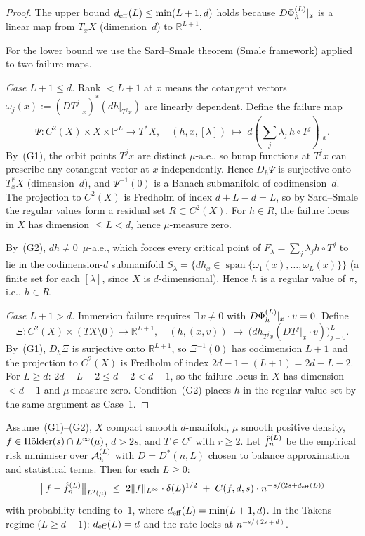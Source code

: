 \begin{proof}
The upper bound $d_{\mathrm{eff}}(L) \leq \min(L+1,d)$ holds because $D\Phi_h^{(L)}|_x$ is a
linear map from $T_x X$ (dimension~$d$) to $\mathbb{R}^{L+1}$.

For the lower bound we use the Sard--Smale theorem
(Smale \cite{Takens1981} framework) applied to two failure maps.

\emph{Case $L+1 \leq d$.}
Rank $< L+1$ at $x$ means the cotangent vectors
$\omega_j(x) := (DT^j|_x)^*(dh|_{T^j x})$ are linearly dependent.
Define the failure map
\[
  \Psi : C^2(X) \times X \times \mathbb{P}^L \to T^*X,
  \quad
  (h, x, [\lambda]) \;\mapsto\; d\!\left(\textstyle\sum_j \lambda_j\, h \circ T^j\right)\bigl|_x.
\]
By~(G1), the orbit points $T^j x$ are distinct $\mu$-a.e., so bump functions
at $T^j x$ can prescribe any cotangent vector at $x$ independently.
Hence $D_h\Psi$ is surjective onto $T^*_x X$ (dimension~$d$), and
$\Psi^{-1}(0)$ is a Banach submanifold of codimension~$d$.
The projection to $C^2(X)$ is Fredholm of index $d + L - d = L$, so by
Sard--Smale the regular values form a residual set $R \subset C^2(X)$.
For $h \in R$, the failure locus in $X$ has dimension $\leq L < d$, hence
$\mu$-measure zero.

By~(G2), $dh \neq 0$~$\mu$-a.e., which forces every critical point of
$F_\lambda = \sum_j \lambda_j h \circ T^j$ to lie in the codimension-$d$
submanifold $S_\lambda = \{dh_x \in \operatorname{span}\{\omega_1(x),\ldots,\omega_L(x)\}\}$
(a finite set for each $[\lambda]$, since $X$ is $d$-dimensional).
Hence $h$ is a regular value of $\pi$, i.e., $h \in R$.

\emph{Case $L+1 > d$.}
Immersion failure requires $\exists\, v \neq 0$ with $D\Phi_h^{(L)}|_x \cdot v = 0$.
Define
\[
  \Xi : C^2(X) \times (TX \setminus 0) \to \mathbb{R}^{L+1},
  \quad
  (h,(x,v)) \;\mapsto\; \bigl(dh_{T^j x}(DT^j|_x \cdot v)\bigr)_{j=0}^L.
\]
By~(G1), $D_h\Xi$ is surjective onto $\mathbb{R}^{L+1}$, so $\Xi^{-1}(0)$
has codimension $L+1$ and the projection to $C^2(X)$ is Fredholm of index
$2d - 1 - (L+1) = 2d - L - 2$.
For $L \geq d$: $2d - L - 2 \leq d - 2 < d-1$, so the failure locus in $X$
has dimension $< d-1$ and $\mu$-measure zero.
Condition~(G2) places $h$ in the regular-value set by the same argument as
Case~1.
\end{proof}

\begin{proposition}
\label{prop:piecewise-rate}
Assume~(G1)--(G2), $X$ compact smooth $d$-manifold, $\mu$ smooth positive
density, $f \in \mathrm{H\ddot{o}lder}(s) \cap L^{\infty}(\mu)$, $d > 2s$,
and $T \in C^r$ with $r \geq 2$.
Let $\hat{f}_n^{(L)}$ be the empirical risk minimiser over $\mathcal{A}_h^{(L)}$ with $D = D^*(n,L)$
chosen to balance approximation and statistical terms.
Then for each $L \geq 0$:
\[
  \bigl\|f - \hat{f}_n^{(L)}\bigr\|_{L^{2}(\mu)}
  \;\leq\;
  2\|f\|_{L^{\infty}} \cdot \delta(L)^{1/2}
  \;+\;
  C(f,d,s) \cdot n^{-s/(2s+d_{\mathrm{eff}}(L))}
\]
with probability tending to~$1$, where $d_{\mathrm{eff}}(L) = \min(L+1,d)$.
In the Takens regime ($L \geq d-1$): $d_{\mathrm{eff}}(L) = d$ and the rate locks at
$n^{-s/(2s+d)}$.
\end{proposition}

